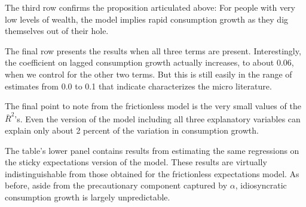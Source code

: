 \documentclass[titlepage]{\econtex}\newcommand{\texname}{cAndCwithStickyE}
\begin{document}
The third row confirms the proposition articulated above: For people with very low levels of wealth, the model implies rapid consumption growth as they dig themselves out of their hole.

The final row presents the results when all three terms are present.  Interestingly, the coefficient on lagged consumption growth actually increases, to about 0.06, when we control for the other two terms.  But this is still easily in the range of estimates from 0.0 to 0.1 that \cite{hrsHabit} indicate characterizes the micro literature.

The final point to note from the frictionless model is the very small values of the $\bar{R}^{2}$'s.  Even the version of the model including all three explanatory variables can explain only about 2 percent of the variation in consumption growth.

The table's lower panel contains results from estimating the same regressions on the sticky expectations version of the model.  These results are virtually indistinguishable from those obtained for the frictionless expectations model.  As before, aside from the precautionary component captured by $\alpha$, idiosyncratic consumption growth is largely unpredictable.

\end{document}
